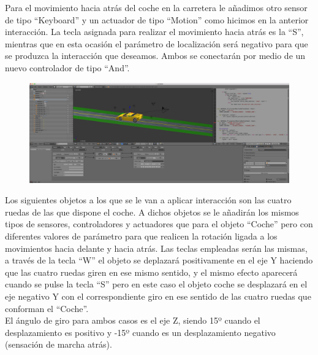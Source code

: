 \documentclass[10pt]{article}
\begin{document}
Para el movimiento hacia atrás del coche en la carretera le añadimos otro sensor de tipo ``Keyboard'' y un actuador de tipo ``Motion'' como hicimos en la anterior interacción. La tecla asignada  para realizar el movimiento hacia atrás es la ``S'', mientras que en esta ocasión el parámetro de localización será negativo para que se produzca la interacción que deseamos. Ambos se conectarán por medio de un nuevo controlador de tipo ``And''.\\

\begin{figure}[H]
	\begin{center}
	 		\includegraphics[width = 1.00\textwidth]{Imagenes/p4-img4}
	\end{center} 
\end{figure}

Los siguientes objetos a los que se le van a aplicar interacción son las cuatro ruedas de las que dispone el coche. A dichos objetos se le añadirán los mismos tipos de sensores, controladores y actuadores que para el objeto ``Coche'' pero con diferentes valores de parámetro para que realicen la rotación ligada a los movimientos hacia delante y hacia atrás. Las teclas empleadas serán las mismas, a través de la tecla ``W'' el objeto se deplazará positivamente en el eje Y haciendo que las cuatro ruedas giren en ese mismo sentido, y el mismo efecto aparecerá cuando se pulse la tecla ``S'' pero en este caso el objeto coche se desplazará en el eje negativo Y con el correspondiente giro en ese sentido de las cuatro ruedas que conforman el ``Coche''. \\

El ángulo de giro para ambos casos es el eje Z, siendo 15º cuando el desplazamiento es positivo y -15º cuando es un desplazamiento negativo (sensación de marcha atrás).
\end{document}
